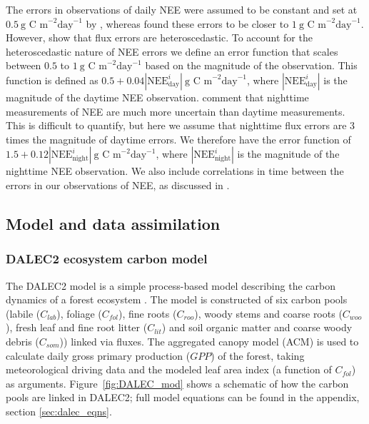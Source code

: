 \documentclass[draft,linenumbers]{agujournal}
\begin{document}
The errors in observations of daily NEE were assumed to be constant and set at $0.5~\text{g C m}^{-2} \text{day}^{-1}$ by \citet{williams2005improved}, whereas \citet{braswell2005estimating} found these errors to be closer to $1~\text{g C m}^{-2} \text{day}^{-1}$. However, \citet{Richardson200838} show that flux errors are heteroscedastic. To account for the heteroscedastic nature of NEE errors we define an error function that scales between $0.5$ to $1~\text{g C m}^{-2} \text{day}^{-1}$ based on the magnitude of the observation. This function is defined as $0.5 + 0.04|\text{NEE}_{\text{day}}^{i}|~\text{g C m}^{-2} \text{day}^{-1}$, where \(|\text{NEE}_{\text{day}}^{i}|\) is the magnitude of the daytime NEE observation. \citet{raupach2005model} comment that nighttime measurements of NEE are much more uncertain than daytime measurements. This is difficult to quantify, but here we assume that nighttime flux errors are 3 times the magnitude of daytime errors. We therefore have the error function of $1.5 + 0.12|\text{NEE}_{\text{night}}^{i}|~\text{g C m}^{-2} \text{day}^{-1}$, where \(|\text{NEE}_{\text{night}}^{i}|\) is the magnitude of the nighttime NEE observation. We also include correlations in time between the errors in our observations of NEE, as discussed in \citet{Pinnington2016299}.

\subsection{Model and data assimilation}
\subsubsection{DALEC2 ecosystem carbon model} \label{sec:dalec2}

The DALEC2 model is a simple process-based model describing the carbon dynamics of a forest ecosystem \citep{Bloom2015}. The model is constructed of six carbon pools (labile ($C_{lab}$), foliage ($C_{fol}$), fine roots ($C_{roo}$), woody stems and coarse roots ($C_{woo}$), fresh leaf and fine root litter ($C_{lit}$) and soil organic matter and coarse woody debris ($C_{som}$)) linked via fluxes. The aggregated canopy model (ACM) \citep{williams1997predicting} is used to calculate daily gross primary production ($GPP$) of the forest, taking meteorological driving data and the {\color{blue}modeled} leaf area index (a function of $C_{fol}$) as arguments. Figure~\ref{fig:DALEC_mod} shows a schematic of how the carbon pools are linked in DALEC2; full model equations can be found in the appendix, section \ref{sec:dalec_eqns}.   
\end{document}
